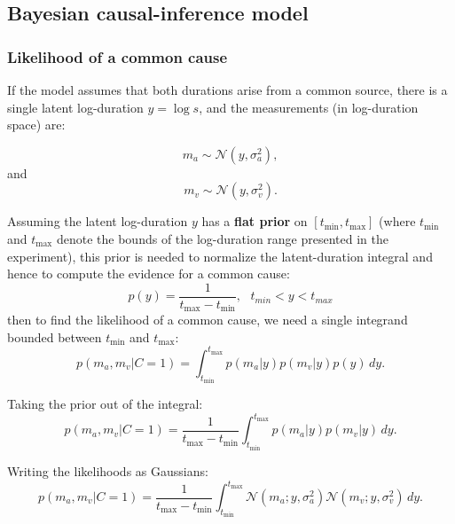 \documentclass[9pt,lineno,doublespacing]{elife}
\begin{document}
\subsection{Bayesian causal-inference model}\label{causal_inf_equations}

\subsubsection{Likelihood of a common cause}

If the model assumes that both durations arise from a common source, there is a single latent log-duration $y = \log s$, and the measurements (in log-duration space) are:

\begin{equation}
\label{eq:ma_given_y}
m_a \sim \mathcal{N}(y, \sigma_a^2),
\end{equation}
and
\begin{equation}
\label{eq:mv_given_y}
m_v \sim \mathcal{N}(y, \sigma_v^2).
\end{equation}

Assuming the latent log-duration $y$ has a \textbf{flat prior} on $[t_{\min}, t_{\max}]$ (where $t_{\min}$ and $t_{\max}$ denote the bounds of the log-duration range presented in the experiment), this prior is needed to normalize the latent-duration integral and hence to compute the evidence for a common cause:
\begin{equation}
p(y) = \frac{1}{t_{\max} - t_{\min}}, 
\text{  } t_{min}<y<t_{max}
\end{equation}
then to find the likelihood of a common cause, we need a single integrand bounded between $t_{\min}$ and $t_{\max}$:
\begin{equation}
\label{eq:likelihood_c1_integral}
p(m_a, m_v | C=1) = \int_{t_{\min}}^{t_{\max}} p(m_a | y) p(m_v | y) p(y) \, dy.
\end{equation}

Taking the prior out of the integral:
\begin{equation}
p(m_a, m_v | C=1) = \frac{1}{t_{\max} - t_{\min}} \int_{t_{\min}}^{t_{\max}} p(m_a | y) p(m_v | y) \, dy.
\end{equation}

Writing the likelihoods as Gaussians:
\begin{equation}
p(m_a, m_v | C=1) = \frac{1}{t_{\max} - t_{\min}} \int_{t_{\min}}^{t_{\max}} \mathcal{N}(m_a; y, \sigma_a^2) \mathcal{N}(m_v; y, \sigma_v^2) \, dy.
\end{equation}
\end{document}
